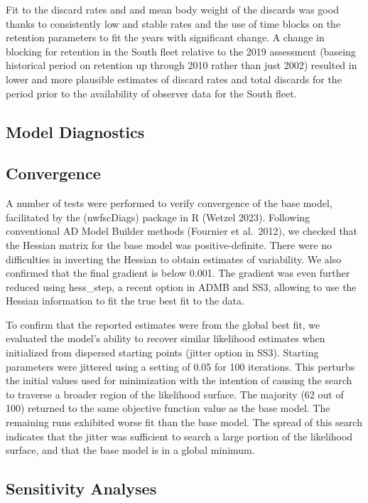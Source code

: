 \documentclass[
]{scrartcl}
\begin{document}
Fit to the discard rates and and mean body weight of the discards was
good thanks to consistently low and stable rates and the use of time
blocks on the retention parameters to fit the years with significant
change. A change in blocking for retention in the South fleet relative
to the 2019 assessment (baseing historical period on retention up %
through 2010 rather than just 2002) resulted in lower and more plausible
estimates of discard rates and total discards for the period prior to
the availability of observer data for the South fleet.

\subsection{Model Diagnostics}\label{model-diagnostics}

\subsection{Convergence}\label{convergence}

A number of tests were performed to verify convergence of the base
model, facilitated by the (nwfscDiags) package in R (Wetzel 2023).
Following conventional AD Model Builder methods (Fournier et al.~2012),
we checked that the Hessian matrix for the base model was
positive-definite. There were no difficulties in inverting the Hessian
to obtain estimates of variability. We also confirmed that the final
gradient is below 0.001. The gradient was even further reduced using
\textsf{hess\_step}, a recent option in ADMB and SS3, allowing to use the Hessian
information to fit the true best fit to the data.

To confirm that the reported estimates were from the global best fit, we
evaluated the model's ability to recover similar likelihood estimates
when initialized from dispersed starting points (jitter option in SS3).
Starting parameters were jittered using a setting of 0.05 for 100
iterations. This perturbs the initial values used for minimization with
the intention of causing the search to traverse a broader region of the
likelihood surface. The majority (62 out of 100) returned to the same
objective function value as the base model. The remaining runs exhibited
worse fit than the base model. The spread of this search indicates that
the jitter was sufficient to search a large portion of the likelihood
surface, and that the base model is in a global minimum.

\subsection{Sensitivity Analyses}\label{sensitivity-analyses}
\end{document}
